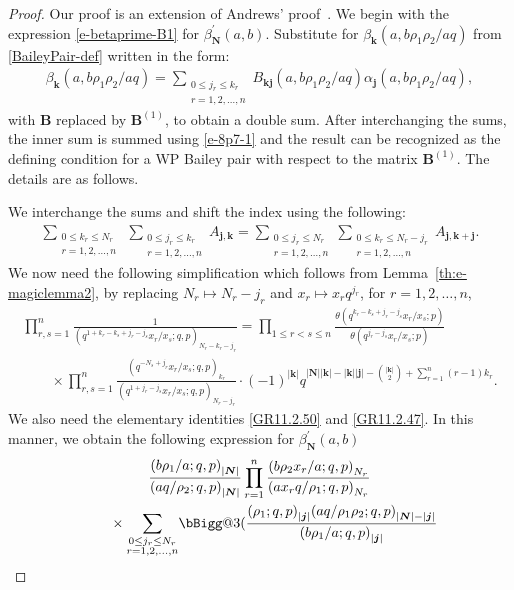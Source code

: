 \documentclass[pdftex]{sigma}
\makeatletter
\numberwithin{equation}{section}
\newcommand{\vast}{\bBigg@{3}} %
\newcommand{\sumN}{{\left| \boldsymbol{N} \right|}}
\newcommand\sumj{{\left| \boldsymbol {j} \right|}}
\newcommand\sumk{{\left| \boldsymbol{k} \right|}}
\newcommand{\B}{{ \mathbf B}}
\newcommand{\N}{{ \boldsymbol N}}
\renewcommand{\k}{{ \boldsymbol{k}}}
\renewcommand{\j}{{ \boldsymbol{j}}}
\newcommand{\multsum}[3]{{\sum\limits_{\substack{{0\le #1_#3 \le #2_#3} \\
{#3 =1,2,\dots, n}}}}}
\newcommand{\triprod}[1]{\prod\limits_{1\le r < s \le #1}}
\newcommand{\sqprod}[1]{\prod\limits_{r, s =1}^{#1}} %
\newcommand{\smallprod}[1]{\prod\limits_{r =1}^{#1}} %
\newcommand{\xover}[1]{#1_{r}/#1_{s}}
\newcommand{\ellipticqrfac}[2]{{\left({#1}; q, p\right)_{#2}}} %
\newcommand{\elliptictheta}[1]{\theta \left({#1} ; p\right) }
\makeatother
\begin{document}
\begin{proof} Our proof is an extension of Andrews' proof~\cite[Theorem~7]{Andrews2001}. We begin with the expression \eqref{e-betaprime-B1} for $\beta_\N^{\prime}(a,b)$. Substitute for $\beta_\k(a,b\rho_1\rho_2/aq)$ from \eqref{BaileyPair-def} written in the form:
\begin{gather}\label{BP-def2}
\beta_\k(a, b\rho_1\rho_2/aq) = \multsum{j}{k}{r} B_{\k\j}(a, b\rho_1\rho_2/aq) \alpha_\j(a,b\rho_1\rho_2/aq),
\end{gather}
with $\B$ replaced by $\B^{(1)}$, to obtain a double sum. After interchanging the sums, the inner sum is summed using \eqref{e-8p7-1} and the result can be recognized as the defining condition for a WP Bailey pair with respect to the matrix $\B^{(1)}$. The details are as follows.

We interchange the sums and shift the index using the following:
\begin{gather*}\label{interchange-shift-sums}
\multsum{k}{N}{r} \ \multsum{j}{k}{r} A_{\j,\k} =\multsum{j}{N}{r}
\sum\limits_{\substack{{0\le k_r \le N_r-j_r} \\
{r =1,2,\dots, n}}} A_{\j,\k+\j}.
\end{gather*}
We now need the following simplification which follows from Lemma~\ref{th:e-magiclemma2}, by replacing $N_r\mapsto N_r-j_r$ and $x_r\mapsto x_rq^{j_r}$, for $r=1, 2, \dots, n$,
\begin{gather*}%
\sqprod n
 \frac{1}{\ellipticqrfac{q^{1+k_r-k_s+j_r-j_s}\xover x }{N_r-k_r-j_r}} =
\triprod{n}
 \frac{\elliptictheta{q^{k_r-k_s+j_r-j_s} \xover {x} }}{\elliptictheta{q^{j_r-j_s} \xover{x}}} \\
\qquad{} \times
 \sqprod n \frac{\ellipticqrfac{q^{-N_s+j_r}\xover x }{k_r}}{\ellipticqrfac{q^{1+j_r-j_s}\xover{x}}{N_r-j_r} } \cdot
(-1)^{\sumk} q^{\sumN\sumk-\sumk\sumj-\binom{\sumk}2 +\sum\limits_{r=1}^n (r-1)k_r}.
\end{gather*}
We also need the elementary identities \eqref{GR11.2.50} and \eqref{GR11.2.47}. In this manner, we obtain the following expression for $\beta_\N^{\prime}(a,b)$
\begin{gather}
\frac{\ellipticqrfac{b\rho_1/a }{\sumN}}{\ellipticqrfac{aq/\rho_2}{\sumN}}
 \smallprod n \frac{\ellipticqrfac{b\rho_2x_r/a}{N_r}}
{\ellipticqrfac{ax_rq/\rho_1}{N_r}}\nonumber\\
\qquad{} \times \multsum{j}{N}{r} \vast(
\frac{\ellipticqrfac{\rho_1}{\sumj}
\ellipticqrfac{aq/\rho_1\rho_2}{\sumN-\sumj} }{\ellipticqrfac{b\rho_1/a}{\sumj}
}
\end{gather}
\end{proof}
\end{document}
